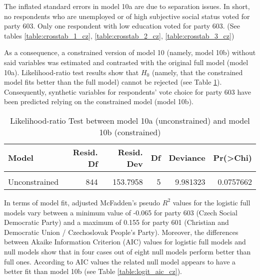 \documentclass[
]{article}
\begin{document}
The inflated standard errors in model 10a are due to separation issues. In short, no respondents who are unemployed or of high subjective social status voted for party 603. Only one respondent with low education voted for party 603. (See tables \ref{table:crosstab_1_cz}, \ref{table:crosstab_2_cz}, \ref{table:crosstab_3_cz})

As a consequence, a constrained version of model 10 (namely, model 10b) without said variables was
estimated and contrasted with the original full model (model 10a). Likelihood-ratio test results show
that \(H_0\) (namely, that the constrained model fits better than the full model) cannot be rejected
(see Table \ref{table:lrtest_1_cz}). Consequently, synthetic variables for respondents' vote choice for
party 603 have been predicted relying on the constrained model (model 10b).

\begin{table}[!h]

\caption{\label{tab:unnamed-chunk-26}Likelihood-ratio Test between model 10a (unconstrained) and model 10b (constrained)
                  \label{table:lrtest_1_cz}}
\centering
\begin{tabular}[t]{l|r|r|r|r|r}
\hline
Model & Resid. Df & Resid. Dev & Df & Deviance & Pr(>Chi)\\
\hline
\cellcolor{gray!6}{Constrained} & \cellcolor{gray!6}{849} & \cellcolor{gray!6}{163.7771} & \cellcolor{gray!6}{} & \cellcolor{gray!6}{} & \cellcolor{gray!6}{}\\
\hline
Unconstrained & 844 & 153.7958 & 5 & 9.981323 & 0.0757662\\
\hline
\end{tabular}
\end{table}

In terms of model fit, adjusted McFadden's pseudo \(R^2\) values for the logistic full models vary between
a minimum value of
-0.065
for party 603
(Czech Social Democratic Party)
and a maximum of
0.155
for party 601
(Christian and Democratic Union / Czechoslovak People's Party).
Moreover, the differences between Akaike Information Criterion (AIC) values for logistic full models and
null models show that in four cases out of eight null models perform better than full ones. According to AIC
values the related null model appears to have a better fit than model 10b (see Table \ref{table:logit_aic_cz}).
\end{document}
